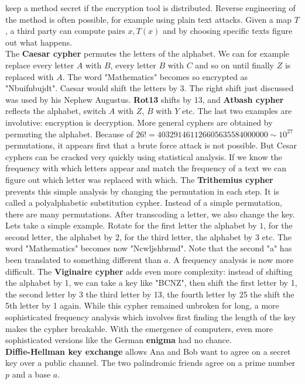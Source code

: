 \documentclass[12pt]{amsart}
\newcounter{example}    \def\example#1{ \item \fontsize{12}{15} \selectfont #1 \fontsize{12}{15} \selectfont }
\begin{document}
keep a method secret if the encryption tool is distributed.  
Reverse engineering of the method is often possible, for example using
plain text attacks. Given a map $T$, a third party can compute pairs $x,T(x)$ and by 
choosing specific texts figure out what happens.  \\
The {\bf Caesar cypher} permutes the letters of the alphabet. We can for example replace every 
letter $A$ with $B$, every letter $B$ with $C$ and so on until finally $Z$ is replaced with $A$. 
The word "Mathematics" becomes so encrypted as "Nbuifnbujdt". Caesar would shift the 
letters by $3$. The right shift just discussed was used by his Nephew Augustus. {\bf Rot13} shifts by 13, 
and {\bf Atbash cypher} reflects the alphabet, switch $A$ with $Z$, $B$ with $Y$ etc. The last two examples are
involutive: encryption is decryption. 
More general cyphers are obtained by permuting the alphabet. Because of $26!=403291461126605635584000000 \sim 10^{27}$
permutations, it appears first that a brute force attack is not possible. But Cesar cyphers can be cracked 
very quickly using  statistical analysis. If we know the frequency with which letters appear and match the frequency 
of a text we can figure out which letter was replaced with which.
The {\bf Trithemius cypher} prevents this simple analysis by changing the permutation in each step.
It is called a polyalphabetic substitution cypher. 
Instead of a simple permutation, there are many permutations. After transcoding a letter, we also change the key. 
Lets take a simple example. Rotate for the first letter the
alphabet by $1$, for the second letter, the alphabet by $2$, for the third letter, the alphabet by $3$
etc.  The word "Mathematics" becomes now "Ncwljshbrmd". Note that the second "a" has been translated 
to something different than $a$. A frequency analysis is now more difficult.
The {\bf Viginaire cypher} adds even more complexity: instead of shifting
the alphabet by 1, we can take a key like "BCNZ", then shift the first letter by 1, the second letter by 3
the third letter by 13, the fourth letter by 25 the shift the 5th letter by 1 again. While this cypher
remained unbroken for long, a more sophisticated frequency analysis which involves first finding
the length of the key makes the cypher breakable. With the emergence of computers, even more sophisticated
versions like the German {\bf enigma} had no chance. \\
{\bf Diffie-Hellman key exchange} allows Ana and Bob want to agree on a secret key
over a public channel. The two palindromic friends agree on a prime number $p$ and a base $a$. 
\end{document}

